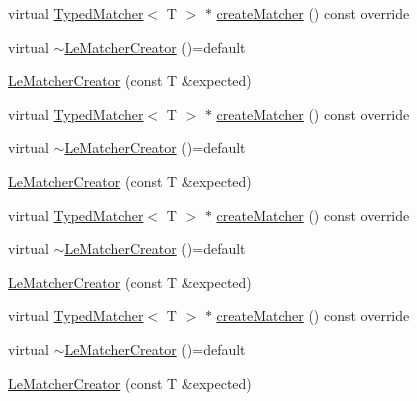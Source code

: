 \begin{DoxyCompactItemize}
virtual \mbox{\hyperlink{structfakeit_1_1TypedMatcher}{Typed\+Matcher}}$<$ T $>$ $\ast$ \mbox{\hyperlink{structfakeit_1_1internal_1_1LeMatcherCreator_a413d0c534701c79a96648111a337f270}{create\+Matcher}} () const override
\item 
virtual \mbox{\hyperlink{structfakeit_1_1internal_1_1LeMatcherCreator_ac886c9e22851607c9464000a64fa5654}{$\sim$\+Le\+Matcher\+Creator}} ()=default
\item 
\mbox{\hyperlink{structfakeit_1_1internal_1_1LeMatcherCreator_a58c849c7f94f5a3fd319b267173cee2b}{Le\+Matcher\+Creator}} (const T \&expected)
\item 
virtual \mbox{\hyperlink{structfakeit_1_1TypedMatcher}{Typed\+Matcher}}$<$ T $>$ $\ast$ \mbox{\hyperlink{structfakeit_1_1internal_1_1LeMatcherCreator_a413d0c534701c79a96648111a337f270}{create\+Matcher}} () const override
\item 
virtual \mbox{\hyperlink{structfakeit_1_1internal_1_1LeMatcherCreator_ac886c9e22851607c9464000a64fa5654}{$\sim$\+Le\+Matcher\+Creator}} ()=default
\item 
\mbox{\hyperlink{structfakeit_1_1internal_1_1LeMatcherCreator_a58c849c7f94f5a3fd319b267173cee2b}{Le\+Matcher\+Creator}} (const T \&expected)
\item 
virtual \mbox{\hyperlink{structfakeit_1_1TypedMatcher}{Typed\+Matcher}}$<$ T $>$ $\ast$ \mbox{\hyperlink{structfakeit_1_1internal_1_1LeMatcherCreator_a413d0c534701c79a96648111a337f270}{create\+Matcher}} () const override
\item 
virtual \mbox{\hyperlink{structfakeit_1_1internal_1_1LeMatcherCreator_ac886c9e22851607c9464000a64fa5654}{$\sim$\+Le\+Matcher\+Creator}} ()=default
\item 
\mbox{\hyperlink{structfakeit_1_1internal_1_1LeMatcherCreator_a58c849c7f94f5a3fd319b267173cee2b}{Le\+Matcher\+Creator}} (const T \&expected)
\item 
virtual \mbox{\hyperlink{structfakeit_1_1TypedMatcher}{Typed\+Matcher}}$<$ T $>$ $\ast$ \mbox{\hyperlink{structfakeit_1_1internal_1_1LeMatcherCreator_a413d0c534701c79a96648111a337f270}{create\+Matcher}} () const override
\item 
virtual \mbox{\hyperlink{structfakeit_1_1internal_1_1LeMatcherCreator_ac886c9e22851607c9464000a64fa5654}{$\sim$\+Le\+Matcher\+Creator}} ()=default
\item 
\mbox{\hyperlink{structfakeit_1_1internal_1_1LeMatcherCreator_a58c849c7f94f5a3fd319b267173cee2b}{Le\+Matcher\+Creator}} (const T \&expected)
\item 

\end{DoxyCompactItemize}
